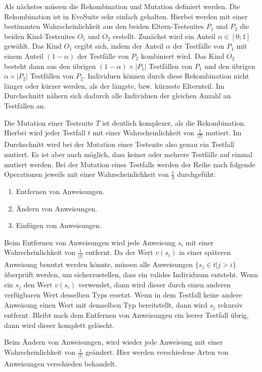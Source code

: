 \documentclass[a4paper,11pt]{article}
\begin{document}
Als nächstes müssen die Rekombination und Mutation definiert werden.
Die Rekombination ist in EvoSuite sehr einfach gehalten.
Hierbei werden mit einer bestimmten Wahrscheinlichkeit aus den beiden Eltern-Testsuites $P_1$ und $P_2$ die beiden Kind-Testsuites $O_1$ und $O_2$ erstellt.
Zunächst wird ein Anteil $\alpha \in [0;1]$ gewählt.
Das Kind $O_1$ ergibt sich, indem der Anteil $\alpha$ der Testfälle von $P_1$ mit einem Anteil $(1 - \alpha)$ der Testfälle von $P_2$ kombiniert wird.
Das Kind $O_2$ besteht dann aus den übrigen $(1 - \alpha) \times |P_1|$ Testfällen von $P_1$ und den übrigen $\alpha \times |P_2|$ Testfällen von $P_2$.
Individuen können durch diese Rekombination nicht länger oder kürzer werden, als der längste, bzw. kürzeste Elternteil.
Im Durchschnitt nähern sich dadurch alle Individuen der gleichen Anzahl an Testfällen an.

Die Mutation einer Testsuite $T$ ist deutlich komplexer, als die Rekombination.
Hierbei wird jeder Testfall $t$ mit einer Wahrscheinlichkeit von $\frac{1}{|T|}$ mutiert.
Im Durchschnitt wird bei der Mutation einer Testsuite also genau ein Testfall mutiert.
Es ist aber auch möglich, dass keiner oder mehrere Testfälle auf einmal mutiert werden. Bei der Mutation eines Testfalls werden der Reihe nach folgende Operationen jeweils mit einer Wahrscheinlichkeit von $\frac{1}{3}$ durchgefüht:
\begin{enumerate}
	\item Entfernen von Anweisungen.
	\item Ändern von Anweisungen.
	\item Einfügen von Anweisungen.
\end{enumerate}

Beim Entfernen von Anweisungen wird jede Anweisung $s_i$ mit einer Wahrscheinlichkeit von $\frac{1}{|t|}$ entfernt.
Da der Wert $v(s_i)$ in einer späteren Anweisung benutzt werden könnte, müssen alle Anweisungen $\{s_j \in t | j > i\}$ überprüft werden, um sicherzustellen, dass ein valides Individuum entsteht.
Wenn ein $s_j$ den Wert $v(s_i)$ verwendet, dann wird dieser durch einen anderen verfügbaren Wert desselben Typs ersetzt.
Wenn in dem Testfall keine andere Anweisung einen Wert mit demselben Typ bereitstellt, dann wird $s_j$ rekursiv entfernt.
Bleibt nach dem Entfernen von Anweisungen ein leerer Testfall übrig, dann wird dieser komplett gelöscht.

Beim Ändern von Anweisungen, wird wieder jede Anweisung mit einer Wahrscheinlichkeit von $\frac{1}{|t|}$ geändert.
Hier werden verschiedene Arten von Anweisungen verschieden behandelt.
\end{document}

